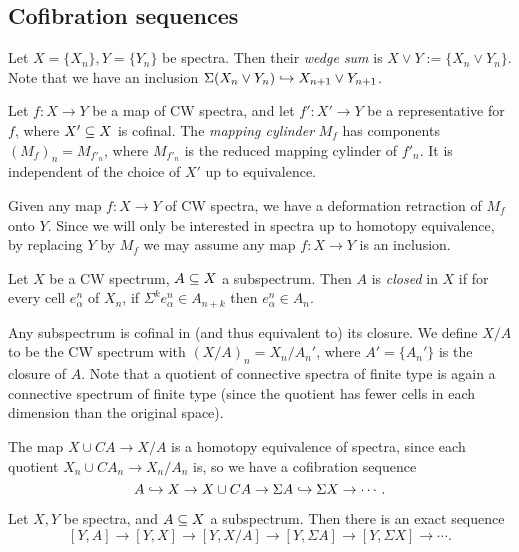 \documentclass{MetricNotes2023}
\def\subq{\ensuremath\subseteq}
\def\inj{\ensuremath\hookrightarrow}
\begin{document}
\subsection{Cofibration sequences}\label{2503291211}

\begin{definition}
Let \(X=\{X_n\}, Y=\{Y_n\}\) be spectra. Then their \textit{wedge sum} is \(X\vee Y :=\{X_n \vee Y_n\}\). Note that %
we have an inclusion \(\Sigma(X_n\vee Y_n)\inj X_{n+1}\vee Y_{n+1}\). 
\end{definition}

\begin{definition}
Let \(f : X \to Y\) be a map of CW spectra, and let \(f' : X' \to Y\) be a representative for \(f\), where \(X'\subq X\) is cofinal. The \textit{mapping cylinder} \(M_f\) has components \((M_f)_n=M_{f'_n}\), where \(M_{f'_n}\) is the reduced mapping cylinder of \(f'_n\). It is independent of the choice of \(X'\) up to equivalence.
\end{definition}

\begin{remark}\label{2504231152}
Given any map \(f : X \to Y\) of CW spectra, we have a deformation retraction of \(M_f\) onto \(Y\). Since we will only be interested in spectra up to homotopy equivalence, by replacing \(Y\) by \(M_f\) we may assume any map \(f : X \to Y\) is an inclusion. 
\end{remark}

\begin{definition}
Let \(X\) be a CW spectrum, \(A\subq X\) a subspectrum. Then \(A\) is \textit{closed} in \(X\) if for every cell \(e_\alpha^n\) of \(X_n\), if \(\Sigma^k e_\alpha^n \in A_{n+k}\) then \(e_\alpha^n \in A_n\). 
\end{definition}

Any subspectrum is cofinal in (and thus equivalent to) its closure. We define \(X/A\) to be the CW spectrum with \((X/A)_n=X_n/A_n'\), where \(A'=\{A_n'\}\) is the closure of \(A\). Note that a quotient of connective spectra of finite type is again a connective spectrum of finite type (since the quotient has fewer cells in each dimension than the original space).

The map \(X\cup CA\to X/A\) is a homotopy equivalence of spectra, since each quotient \(X_n \cup CA_n \to X_n/A_n\) is, so we have a cofibration sequence
\[A \inj X \to X\cup CA \to \Sigma A \inj \Sigma X \to \cdots.\]

\begin{theorem}\label{2504151709}
Let \(X,Y\) be spectra, and \(A\subq X\) a subspectrum. Then there is an exact sequence
\[[Y,A]\to[Y,X]\to[Y,X/A]\to[Y,\Sigma A]\to[Y,\Sigma X]\to\cdots.\]
\end{theorem}
\end{document}
